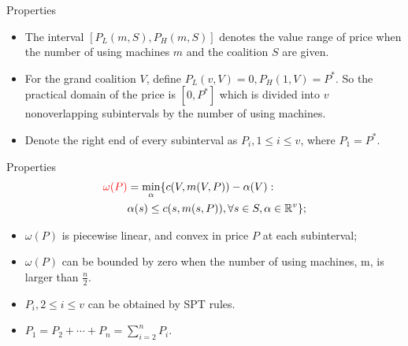 \documentclass[14pt]{beamer}
\begin{document}
\begin{frame}{Properties}
	\begin{definition}\label{definition:subinterval}
	\small
	\justifying
	\begin{itemize}
	\item The interval $[P_L(m,S),P_H(m,S)]$ denotes the value range of price when the number of using machines $m$ and the coalition $S$ are given.
	\pause
	\item For the grand coalition $V$, define $P_L(v,V) = 0, P_H(1,V) = P^*$. So the practical domain of the price is $[0,P^*]$ which is divided into $v$ nonoverlapping subintervals by the number of using machines.
	\pause
	\item Denote the right end of every subinterval as $P_i, 1 \leq i \leq v$, where $P_1 = P^*$.
	\end{itemize}
	\end{definition}
\end{frame}

\begin{frame}{Properties}
	\vspace{-12mm}
		\begin{eqnarray*}
		\textcolor{red}{\omega(P)} & =\mathop{\min}_{\alpha}\{c(V,m(V,P))-\alpha(V): \\
		 &\alpha(s)\leq c(s,m(s,P)),\forall s \in S, \alpha\in\mathbb{R}^{v}\};
		\end{eqnarray*}

		\begin{itemize}
		\justifying
			\pause
			\item ${\omega(P)}$ is piecewise linear, and convex in price $P$ at each subinterval;
			\pause
			\item $\omega(P)$ can be bounded by zero when the number of using machines, m, is larger than $\frac{n}{2}$.
			\pause
			\item $P_i, 2 \leq i \leq v$ can be obtained by SPT rules.
			\pause
			\item $P_{1}=P_{2}+\cdots+P_{n}=\sum_{i=2}^n P_i$.

	\end{itemize}
\end{frame}
\end{document}
